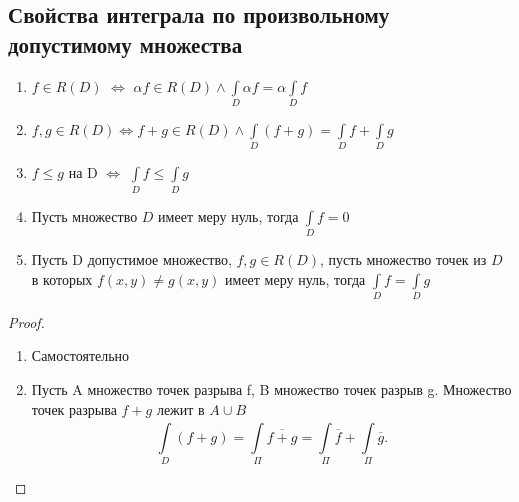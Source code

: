 \documentclass[14pt]{extarticle} \usepackage{fontspec}
\begin{document}
\subsection{Свойства интеграла по произвольному допустимому множества}
\begin{enumerate}
    \item $f \in R(D)$   $\iff$  $\alpha f \in R(D) \land \int\limits_{D}^{} \alpha f = \alpha \int\limits_{D}^{} f  $
     \item $f,g \in R(D) \iff f + g \in R(D) \land \int\limits_{D}^{} (f+g) = \int\limits_{D}^{} f + \int\limits_{D}^{} g   $
     \item $f \le g $ на D $\iff$  $\int\limits_{D}^{} f \le  \int\limits_{D}^{} g  $
    \item Пусть множество $D$ имеет меру нуль, тогда  $\int\limits_{D}^{} f = 0 $
    \item Пусть D допустимое множество, $f,g \in R(D)$, пусть множество точек из  $D$ в которых  $f(x,y) \neq g(x,y)$ имеет меру нуль, тогда $\int\limits_{D}^{} f = \int\limits_{D}^{} g  $
\end{enumerate}
\begin{proof}
    \begin{enumerate}
        \item Самостоятельно
        \item Пусть A множество точек разрыва f, B множество точек разрыв g. Множество точек разрыва $f+g$ лежит в  $A \cup B$
            \[
            \int\limits_{D}^{}   (f + g) = \int\limits_{\Pi}^{}  \overline{f + g} = 
            \int\limits_{\Pi}^{}   \overline{f} + \int\limits_{\Pi}^{}   \overline{g}
            .\] 
    \end{enumerate}
\end{proof}
\end{document}
